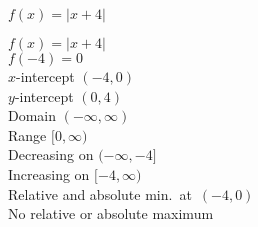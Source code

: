 {$f(x) = |x + 4|$}
{$f(x) = |x + 4|$ \\ $f(-4) = 0$ \\ $x$-intercept $(-4, 0)$ \\ $y$-intercept $(0, 4)$ \\ Domain $(-\infty, \infty)$ \\ Range $[0, \infty)$ \\ Decreasing on $(-\infty, -4]$ \\ Increasing on $[-4, \infty)$ \\ Relative and absolute min.~at~$(-4,0)$ \\ No relative or absolute maximum

\begin{center}
\end{center}}